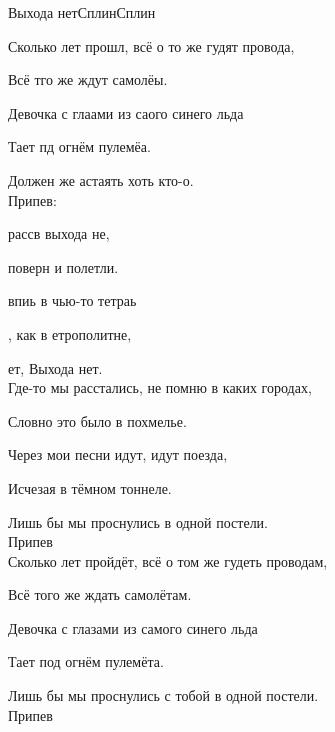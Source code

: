 \documentclass[11pt,a5paper]{book}
\renewcommand{\tt}{\indent \indent}
\begin{document}
\begin{song}{Выхода нет}{}{Сплин}{Сплин}{}{}

Сколько лет прошл, всё о то же гудят провода,\par
{}Всё тго же ждут самолёы.\par
{}Девочка с глаами из саого синего льда\par
{}Тает пд огнём пулемёа.\par
{}Должен же астаять хоть кто-о.\\

Припев:\par
{} рассв выхода не,\par
{} поверн и полетли.\par
{} впиь в чью-то тетраь\par
{}, как в етрополитне,\par
{} ет, Выхода нет. \\

Где-то мы расстались, не помню в каких городах,\par
Словно это было в похмелье.\par
Через мои песни идут, идут поезда,\par
Исчезая в тёмном тоннеле.\par
Лишь бы мы проснулись в одной постели.\\

Припев\\

Сколько лет пройдёт, всё о том же гудеть проводам,\par
Всё того же ждать самолётам.\par
Девочка с глазами из самого синего льда\par
Тает под огнём пулемёта.\par
Лишь бы мы проснулись с тобой в одной постели.\\

Припев
\end{song}
\end{document}
